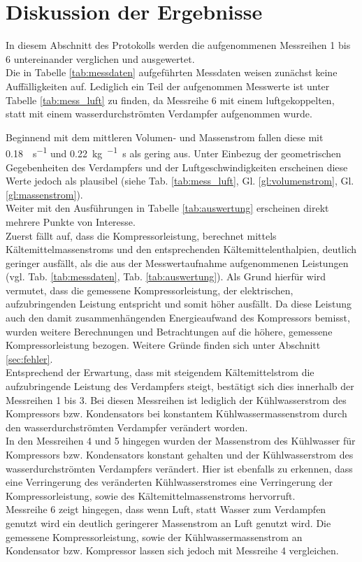 \newpage
\section{Diskussion der Ergebnisse}
\label{sec:diskussion}

In diesem Abschnitt des Protokolls werden die aufgenommenen Messreihen 1 bis 6 untereinander verglichen und ausgewertet.\\

Die in Tabelle \ref{tab:messdaten} aufgeführten Messdaten weisen zunächst keine Auffälligkeiten auf. Lediglich ein Teil der aufgenommen Messwerte ist unter Tabelle \ref{tab:mess_luft} zu finden, da Messreihe 6 mit einem luftgekoppelten, statt mit einem wasserdurchströmten Verdampfer aufgenommen wurde.

Beginnend mit dem mittleren Volumen- und Massenstrom fallen diese mit \SI{0,18}{\kmeter \per \second} und \SI{0,22}{\kg \per \per \second} als gering aus. Unter Einbezug der geometrischen Gegebenheiten des Verdampfers und der Luftgeschwindigkeiten erscheinen diese Werte jedoch als plausibel \linebreak (siehe Tab. \ref{tab:mess_luft}, Gl.  \ref{gl:volumenstrom}, Gl. \ref{gl:massenstrom}).\\

Weiter mit den Ausführungen in Tabelle \ref{tab:auswertung} erscheinen direkt mehrere Punkte von Interesse.\\
Zuerst fällt auf, dass die Kompressorleistung, berechnet mittels Kältemittelmassenstroms und den entsprechenden Kältemittelenthalpien, deutlich geringer ausfällt, als die aus der Messwertaufnahme aufgenommenen Leistungen (vgl. Tab. \ref{tab:messdaten}, Tab. \ref{tab:auswertung}). 
Als Grund hierfür wird vermutet, dass die gemessene Kompressorleistung, der elektrischen, aufzubringenden Leistung  entspricht und somit höher ausfällt. Da diese Leistung auch den damit zusammenhängenden Energieaufwand des Kompressors bemisst, wurden weitere Berechnungen und Betrachtungen auf die höhere, gemessene Kompressorleistung bezogen. Weitere Gründe finden sich unter Abschnitt \ref{sec:fehler}.\\
Entsprechend der Erwartung, dass mit steigendem Kältemittelstrom die aufzubringende Leistung des Verdampfers steigt, bestätigt sich dies innerhalb der Messreihen 1 bis 3. Bei diesen Messreihen ist lediglich der Kühlwasserstrom des Kompressors bzw. Kondensators
bei konstantem Kühlwassermassenstrom durch den wasserdurchströmten Verdampfer verändert worden.\\
In den Messreihen 4 und 5 hingegen wurden der Massenstrom des Kühlwasser für Kompressors bzw. Kondensators konstant gehalten und der Kühlwasserstrom des wasserdurchströmten Verdampfers verändert. Hier ist ebenfalls zu erkennen, dass eine Verringerung des veränderten Kühlwasserstromes eine Verringerung der Kompressorleistung, sowie des Kältemittelmassenstroms hervorruft.\\
Messreihe 6 zeigt hingegen, dass wenn Luft, statt Wasser zum Verdampfen genutzt wird ein deutlich geringerer Massenstrom an Luft genutzt wird. Die gemessene Kompressorleistung, sowie der Kühlwassermassenstrom an Kondensator bzw. Kompressor lassen sich jedoch mit Messreihe 4 vergleichen. \\


